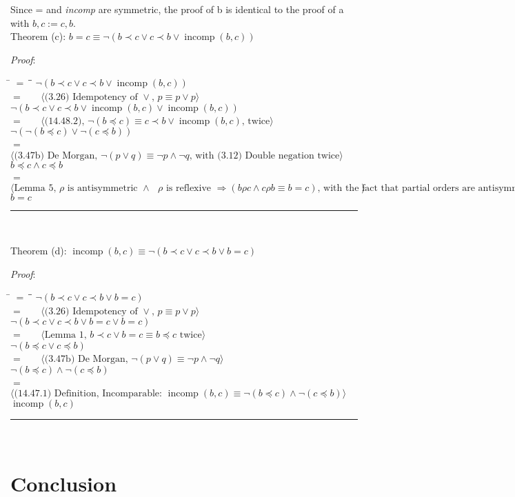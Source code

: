 \documentclass[12pt, fleqn, leqno]{article}
\newcommand{\lgap}{2pt}                             %
\newcommand{\mymathindent}{24pt}                    %
\newcommand{\impl}{\ensuremath{\Rightarrow}}        %
\newcommand{\myqed}{\rule[-.23ex]{1.2ex}{2.0ex}}
\newcommand{\myqedtab}{\hspace{384pt}}              %
\newcommand{\Gll} {\langle}                         %
\newcommand{\Ggg} {\rangle}                         %
\newcommand{\Hint}[1]     {\ \ \ $\Gll              \mbox{#1} \Ggg$ }   %
\DeclareMathOperator{\incomp}{incomp}
\begin{document}
Since = and \textit{incomp} are symmetric, the proof of b is identical to the proof of a with $b, c := c, b$.\\

Theorem (c): $b = c \equiv \lnot(b \prec c \lor c \prec b \lor \incomp(b, c))$

\textit{Proof}:
\begin{tabbing}
\hspace{\mymathindent} \= $= \;$ \= \myqedtab \= \kill
	\> \>  $\lnot (b \prec c \lor c \prec b \lor \incomp(b, c))$\\
	\> $=$  \>  \Hint{(3.26) Idempotency of $\lor$, $p \equiv p \lor p$}\\[\lgap]
	\> \>   $\lnot (b \prec c \lor c \prec b \lor \incomp(b, c) \lor \incomp(b, c))$\\
	\> $=$  \>  \Hint{(14.48.2), $\lnot (b \preceq c) \equiv c \prec b\lor \incomp(b, c)$, twice}\\[\lgap]
	\> \>   $\lnot ( \lnot (b \preceq c) \lor \lnot (c \preceq b))$\\
	\> $=$  \>  \Hint{(3.47b) De Morgan, $\lnot (p \lor q) \equiv \lnot p \land \lnot q$, with (3.12) Double negation twice}\\[\lgap]
	\> \>   $b \preceq c \land c \preceq b$\\
	\> $=$  \>  \Hint{Lemma 5, $\rho$ is antisymmetric $\land$ $\rho$ is reflexive $\impl (b \rho c \land c \rho b \equiv b = c)$, with the fact that partial orders are antisymmetric and reflexive}\\[\lgap]
	\> \>   $b = c$ \quad \myqed\\
\end{tabbing}

Theorem (d): $\incomp(b, c) \equiv \lnot(b \prec c \lor c \prec b \lor b = c)$

\textit{Proof}:
\begin{tabbing}
\hspace{\mymathindent} \= $= \;$ \= \myqedtab \= \kill
	\> \>  $\lnot(b \prec c \lor c \prec b \lor b = c)$\\
	\> $=$  \>  \Hint{(3.26) Idempotency of $\lor$, $p \equiv p \lor p$}\\[\lgap]
	\> \>   $\lnot(b \prec c \lor c \prec b \lor b = c \lor b = c)$\\
	\> $=$  \>  \Hint{Lemma 1, $b \prec c \lor b = c \equiv b \preceq c$ twice}\\[\lgap]
	\> \>   $\lnot (b \preceq c \lor c \preceq b)$\\
	\> $=$  \>  \Hint{(3.47b) De Morgan, $\lnot (p \lor q) \equiv \lnot p \land \lnot q$}\\[\lgap]
	\> \>   $\lnot (b \preceq c) \land \lnot (c \preceq b)$\\
	\> $=$  \>  \Hint{(14.47.1) Definition, Incomparable: $\incomp(b, c) \equiv \lnot(b \preceq c) \land \lnot(c \preceq b)$}\\[\lgap]
	\> \>   $\incomp(b, c)$ \quad \myqed\\
\end{tabbing}

\section{Conclusion}



\end{document}
